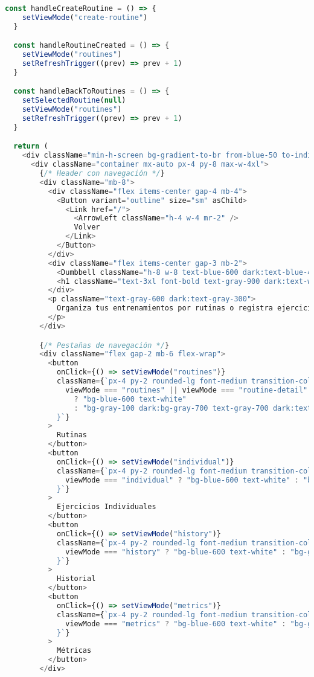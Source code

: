 \documentclass[12pt,a4paper]{article}
\begin{document}
\begin{lstlisting}[language=typescript, caption=app/gym/page.tsx - Estructura completa]
  const handleCreateRoutine = () => {
    setViewMode("create-routine")
  }

  const handleRoutineCreated = () => {
    setViewMode("routines")
    setRefreshTrigger((prev) => prev + 1)
  }

  const handleBackToRoutines = () => {
    setSelectedRoutine(null)
    setViewMode("routines")
    setRefreshTrigger((prev) => prev + 1)
  }

  return (
    <div className="min-h-screen bg-gradient-to-br from-blue-50 to-indigo-100 dark:from-gray-900 dark:to-gray-800">
      <div className="container mx-auto px-4 py-8 max-w-4xl">
        {/* Header con navegación */}
        <div className="mb-8">
          <div className="flex items-center gap-4 mb-4">
            <Button variant="outline" size="sm" asChild>
              <Link href="/">
                <ArrowLeft className="h-4 w-4 mr-2" />
                Volver
              </Link>
            </Button>
          </div>
          <div className="flex items-center gap-3 mb-2">
            <Dumbbell className="h-8 w-8 text-blue-600 dark:text-blue-400" />
            <h1 className="text-3xl font-bold text-gray-900 dark:text-white">Gimnasio</h1>
          </div>
          <p className="text-gray-600 dark:text-gray-300">
            Organiza tus entrenamientos por rutinas o registra ejercicios individuales
          </p>
        </div>

        {/* Pestañas de navegación */}
        <div className="flex gap-2 mb-6 flex-wrap">
          <button
            onClick={() => setViewMode("routines")}
            className={`px-4 py-2 rounded-lg font-medium transition-colors ${
              viewMode === "routines" || viewMode === "routine-detail" || viewMode === "create-routine"
                ? "bg-blue-600 text-white"
                : "bg-gray-100 dark:bg-gray-700 text-gray-700 dark:text-gray-300 hover:bg-gray-200 dark:hover:bg-gray-600"
            }`}
          >
            Rutinas
          </button>
          <button
            onClick={() => setViewMode("individual")}
            className={`px-4 py-2 rounded-lg font-medium transition-colors ${
              viewMode === "individual" ? "bg-blue-600 text-white" : "bg-gray-100 dark:bg-gray-700 text-gray-700 dark:text-gray-300 hover:bg-gray-200 dark:hover:bg-gray-600"
            }`}
          >
            Ejercicios Individuales
          </button>
          <button
            onClick={() => setViewMode("history")}
            className={`px-4 py-2 rounded-lg font-medium transition-colors ${
              viewMode === "history" ? "bg-blue-600 text-white" : "bg-gray-100 dark:bg-gray-700 text-gray-700 dark:text-gray-300 hover:bg-gray-200 dark:hover:bg-gray-600"
            }`}
          >
            Historial
          </button>
          <button
            onClick={() => setViewMode("metrics")}
            className={`px-4 py-2 rounded-lg font-medium transition-colors ${
              viewMode === "metrics" ? "bg-blue-600 text-white" : "bg-gray-100 dark:bg-gray-700 text-gray-700 dark:text-gray-300 hover:bg-gray-200 dark:hover:bg-gray-600"
            }`}
          >
            Métricas
          </button>
        </div>


\end{lstlisting}
\end{document}
